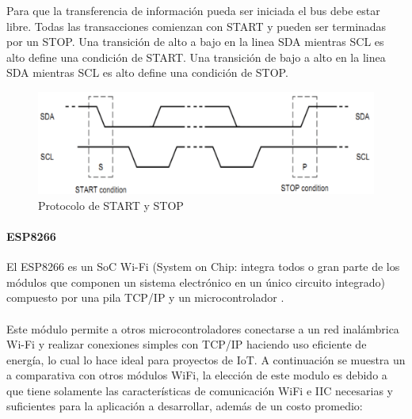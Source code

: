 Para que la transferencia de información pueda ser iniciada el bus debe estar libre. Todas las transacciones comienzan con START y pueden ser terminadas por un STOP.
Una transición de alto a bajo en la linea SDA mientras SCL es alto define una condición de START.
Una transición de bajo a alto en la linea SDA mientras SCL es alto define una condición de STOP.

\begin{figure}[H]
	\centering
	\includegraphics[scale=.25]{Capitulo2/images/startstop.png}
	\caption{Protocolo de START y STOP}
	\label{fig:}
\end{figure}


\paragraph{ESP8266}
El ESP8266 es un SoC Wi-Fi \citep{MarcoTeorico7} (System on Chip: integra todos o gran parte de los módulos que componen un sistema electrónico en un único circuito integrado) compuesto por una pila TCP/IP y un microcontrolador \citep{MarcoTeorico8}.
\paragraph{}

Este módulo permite a otros microcontroladores conectarse a un red inalámbrica Wi-Fi y realizar conexiones simples con TCP/IP haciendo uso eficiente de energía, lo cual lo hace ideal para proyectos de IoT. A continuación se muestra un a comparativa con otros módulos WiFi, la elección de este modulo es debido a que tiene solamente las características de comunicación WiFi e IIC necesarias y suficientes para la aplicación a desarrollar, además de un costo promedio:

